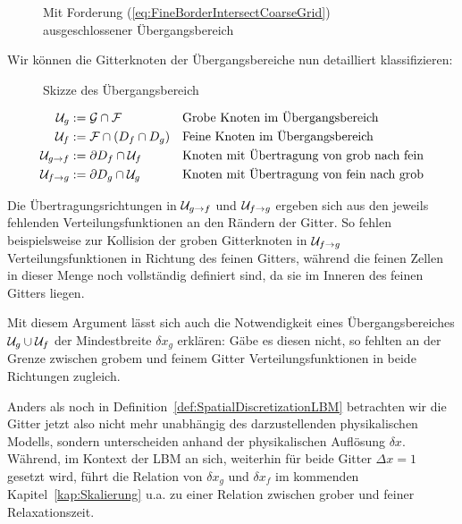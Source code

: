 \begin{figure}[h]
\centering

\caption{Mit Forderung (\ref{eq:FineBorderIntersectCoarseGrid}) ausgeschlossener Übergangsbereich \cite[vgl. Abb.~9]{Lagrava12}}
\label{fig:InvalidOverlapArea}
\end{figure}

\noindent
Wir können die Gitterknoten der Übergangsbereiche nun detailliert klassifizieren:

\begin{figure}[h]
\centering

\caption{Skizze des Übergangsbereich \cite[vgl.~Abb.~4]{Lagrava12}}
\label{fig:OverlapZone}
\end{figure}

\begin{Definition}
\label{def:OverlapGridNodes}
\begin{align*}
\mathcal{U}_g &:= \mathcal{G} \cap \mathcal{F} && \text{Grobe Knoten im Übergangsbereich} \\
\mathcal{U}_f &:= \mathcal{F} \cap (D_f \cap D_g) && \text{Feine Knoten im Übergangsbereich} \\
\mathcal{U}_{g \to f} &:= \partial D_f \cap \mathcal{U}_f && \text{Knoten mit Übertragung von grob nach fein} \\
\mathcal{U}_{f \to g} &:= \partial D_g \cap \mathcal{U}_g && \text{Knoten mit Übertragung von fein nach grob}
\end{align*}
\end{Definition}

Die Übertragungsrichtungen in \(\mathcal{U}_{g \to f}\) und \(\mathcal{U}_{f \to g}\) ergeben sich aus den jeweils fehlenden Verteilungsfunktionen an den Rändern der Gitter. So fehlen beispielsweise zur Kollision der groben Gitterknoten in \(\mathcal{U}_{f \to g}\) Verteilungsfunktionen in Richtung des feinen Gitters, während die feinen Zellen in dieser Menge noch vollständig definiert sind, da sie im Inneren des feinen Gitters liegen.

Mit diesem Argument lässt sich auch die Notwendigkeit eines Übergangsbereiches \(\mathcal{U}_g \cup \mathcal{U}_f\) der Mindestbreite \(\delta x_g\) erklären: Gäbe es diesen nicht, so fehlten an der Grenze zwischen grobem und feinem Gitter Verteilungsfunktionen in beide Richtungen zugleich.

\bigskip
Anders als noch in Definition~\ref{def:SpatialDiscretizationLBM} betrachten wir die Gitter jetzt also nicht mehr unabhängig des darzustellenden physikalischen Modells, sondern unterscheiden anhand der physikalischen Auflösung \(\delta x\). Während, im Kontext der LBM an sich, weiterhin für beide Gitter \(\Delta x = 1\) gesetzt wird, führt die Relation von \(\delta x_g\) und \(\delta x_f\) im kommenden Kapitel~\ref{kap:Skalierung} u.a. zu einer Relation zwischen grober und feiner Relaxationszeit.

